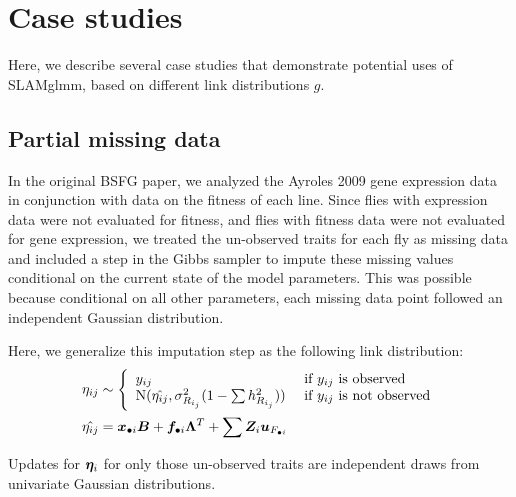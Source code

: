 \documentclass[11pt]{amsart}
\newcommand*{\B}[1]{\ifmmode\bm{#1}\else\textbf{#1}\fi}
\begin{document}
\section{Case studies}
\label{link_functions}
Here, we describe several case studies that demonstrate potential uses of SLAMglmm, based on different link distributions $g$.

\subsection{Partial missing data}
In the original BSFG paper, we analyzed the Ayroles 2009 gene expression data in conjunction with data on the fitness of each line. Since flies with expression data were not evaluated for fitness, and flies with fitness data were not evaluated for gene expression, we treated the un-observed traits for each fly as missing data and included a step in the Gibbs sampler to impute these missing values conditional on the current state of the model parameters. This was possible because conditional on all other parameters, each missing data point followed an independent Gaussian distribution.

Here, we generalize this imputation step as the following link distribution:
\begin{align} \begin{split}
\eta_{ij} &\sim \Bigg\{\begin{array}{l l}
y_{ij} & \mbox{ if } y_{ij} \mbox{ is observed} \\
\mbox{N}(\hat{\eta_{ij}},\sigma^2_{R_{i_j}}(1-\sum h^2_{R_{i_j}})) & \mbox{ if } y_{ij} \mbox{ is not observed}
\end{array} \\
\hat{\eta_{ij}} &= \B{x}_{\bullet i} \B{B} + \B{f}_{\bullet i} \B{\Lambda}^T + \sum \B{Z}_i \B{u}_{F_{\bullet i}}
\end{split}\end{align}

\noindent Updates for $\B{\eta}_i$ for only those un-observed traits are independent draws from univariate Gaussian distributions. 
\end{document}
